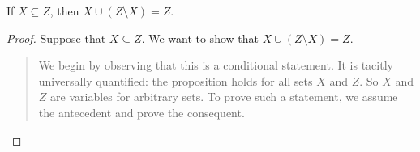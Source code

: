 \documentclass[../../../include/open-logic-section]{subfiles}
\begin{document}


\begin{prop}
If $X \subseteq Z$, then $X \cup (Z \setminus X) = Z$.
\end{prop}  

\begin{proof}
  Suppose that $X \subseteq Z$.  We want to show that $X \cup (Z
  \setminus X) = Z$.
  \begin{quote}
    We begin by observing that this is a conditional statement. It is
    tacitly universally quantified: the proposition holds for all sets
    $X$ and $Z$. So $X$ and $Z$ are variables for arbitrary sets. To
    prove such a statement, we assume the antecedent and prove the
    consequent.


\end{quote}
\end{proof}
\end{document}
